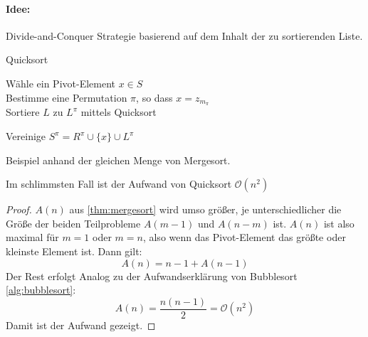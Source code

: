 \paragraph{Idee:} Divide-and-Conquer Strategie basierend auf dem Inhalt der zu sortierenden Liste.
\begin{algorithm}
\label{alg:quicksort}
\caption{Quicksort}
	Wähle ein Pivot-Element $x \in S$ \\
	Bestimme eine Permutation $\pi$, so dass $x=z_{m_{\pi}}$\\
	{
	Sortiere $L$ zu $L^{\pi}$ mittels Quicksort
	}

	Vereinige $S^{\pi}= R^{\pi} \cup \{x\} \cup L^{\pi}$
\end{algorithm}
\begin{example}
Beispiel anhand der gleichen Menge von Mergesort.
\end{example}
\begin{lemma}
Im schlimmsten Fall ist der Aufwand von Quicksort $\mathcal{O}(n^2)$
\end{lemma}
\begin{proof}
$A(n)$ aus \ref{thm:mergesort} wird umso größer, je unterschiedlicher die Größe der beiden Teilprobleme $A(m-1)$ und $A(n-m)$ ist.
$A(n)$ ist also maximal für $m=1$ oder $m=n$, also wenn das Pivot-Element das größte oder kleinste Element ist. Dann gilt:
\[
A(n)=n-1+A(n-1)
\]
Der Rest erfolgt Analog zu der Aufwandserklärung von Bubblesort \ref{alg:bubblesort}:
\[
A(n)=\frac{n(n-1)}{2}= \mathcal{O}(n^2)
\]
Damit ist der Aufwand gezeigt.
\end{proof}
